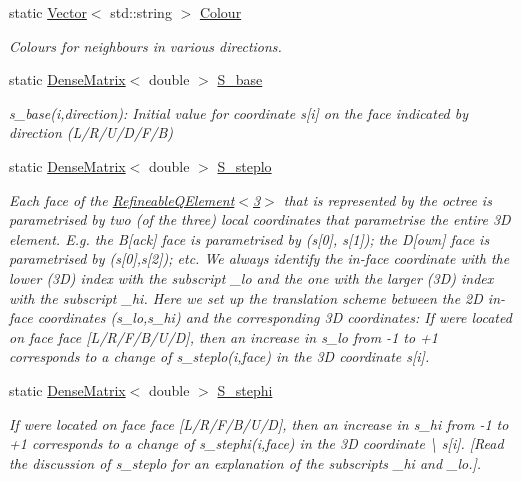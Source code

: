 \begin{DoxyCompactItemize}
static \hyperlink{classoomph_1_1Vector}{Vector}$<$ std\+::string $>$ \hyperlink{classoomph_1_1OcTree_a11213866602c59eae49ac1c9164b9785}{Colour}
\begin{DoxyCompactList}\small\item\em Colours for neighbours in various directions. \end{DoxyCompactList}\item 
static \hyperlink{classoomph_1_1DenseMatrix}{Dense\+Matrix}$<$ double $>$ \hyperlink{classoomph_1_1OcTree_a114adf939f2937d16a69a541b8e2ceb3}{S\+\_\+base}
\begin{DoxyCompactList}\small\item\em s\+\_\+base(i,direction)\+: Initial value for coordinate s\mbox{[}i\mbox{]} on the face indicated by direction (L/\+R/\+U/\+D/\+F/B) \end{DoxyCompactList}\item 
static \hyperlink{classoomph_1_1DenseMatrix}{Dense\+Matrix}$<$ double $>$ \hyperlink{classoomph_1_1OcTree_af1c005f0207cae66390314859edd9bd1}{S\+\_\+steplo}
\begin{DoxyCompactList}\small\item\em Each face of the \hyperlink{classoomph_1_1RefineableQElement_3_013_01_4}{Refineable\+Q\+Element$<$3$>$} that is represented by the octree is parametrised by two (of the three) local coordinates that parametrise the entire 3D element. E.\+g. the B\mbox{[}ack\mbox{]} face is parametrised by (s\mbox{[}0\mbox{]}, s\mbox{[}1\mbox{]}); the D\mbox{[}own\mbox{]} face is parametrised by (s\mbox{[}0\mbox{]},s\mbox{[}2\mbox{]}); etc. We always identify the in-\/face coordinate with the lower (3D) index with the subscript {\ttfamily \+\_\+lo} and the one with the larger (3D) index with the subscript {\ttfamily \+\_\+hi}. Here we set up the translation scheme between the 2D in-\/face coordinates (s\+\_\+lo,s\+\_\+hi) and the corresponding 3D coordinates\+: If we\textquotesingle{}re located on face {\ttfamily face} \mbox{[}L/\+R/\+F/\+B/\+U/D\mbox{]}, then an increase in s\+\_\+lo from -\/1 to +1 corresponds to a change of {\ttfamily s\+\_\+steplo(i,face)} in the 3D coordinate {\ttfamily s}\mbox{[}i\mbox{]}. \end{DoxyCompactList}\item 
static \hyperlink{classoomph_1_1DenseMatrix}{Dense\+Matrix}$<$ double $>$ \hyperlink{classoomph_1_1OcTree_addcc327c9831b6c57f30c8596125c236}{S\+\_\+stephi}
\begin{DoxyCompactList}\small\item\em If we\textquotesingle{}re located on face {\ttfamily face} \mbox{[}L/\+R/\+F/\+B/\+U/D\mbox{]}, then an increase in s\+\_\+hi from -\/1 to +1 corresponds to a change of {\ttfamily s\+\_\+stephi(i,face)} in the 3D coordinate \textbackslash{} s\mbox{[}i\mbox{]}. \mbox{[}Read the discussion of {\ttfamily s\+\_\+steplo} for an explanation of the subscripts {\ttfamily \+\_\+hi} and {\ttfamily \+\_\+lo}.\mbox{]}. \end{DoxyCompactList}\item 

\end{DoxyCompactItemize}
